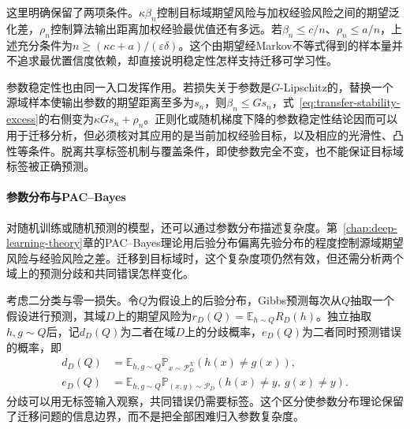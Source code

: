 这里明确保留了两项条件。$\kappa\beta_n$控制目标域期望风险与加权经验风险之间的期望泛化差，$\rho_n$控制算法输出距离加权经验最优值还有多远。若$\beta_n\leq c/n$、$\rho_n\leq a/n$，上述充分条件为$n\geq(\kappa c+a)/(\varepsilon\delta)$。这个由期望经Markov不等式得到的样本量并不追求最优置信度依赖，却直接说明稳定性怎样支持迁移可学习性。

参数稳定性也由同一入口发挥作用。若损失关于参数是$G$-Lipschitz的，替换一个源域样本使输出参数的期望距离至多为$s_n$，则$\beta_n\leq Gs_n$，式~\eqref{eq:transfer-stability-excess}的右侧变为$\kappa Gs_n+\rho_n$。正则化或随机梯度下降的参数稳定性结论因而可以用于迁移分析，但必须核对其应用的是当前加权经验目标，以及相应的光滑性、凸性等条件。脱离共享标签机制与覆盖条件，即使参数完全不变，也不能保证目标域标签被正确预测。

\paragraph{参数分布与PAC--Bayes}
\label{sec:transfer-pac-bayes}

对随机训练或随机预测的模型，还可以通过参数分布描述复杂度。第~\ref{chap:deep-learning-theory}章的PAC--Bayes理论用后验分布偏离先验分布的程度控制源域期望风险与经验风险之差。迁移到目标域时，这个复杂度项仍然有效，但还需分析两个域上的预测分歧和共同错误怎样变化。

考虑二分类与零一损失。令$Q$为假设上的后验分布，Gibbs预测每次从$Q$抽取一个假设进行预测，其域$D$上的期望风险为$r_D(Q)=\mathbb E_{h\sim Q}R_D(h)$。独立抽取$h,g\sim Q$后，记$d_D(Q)$为二者在域$D$上的分歧概率，$e_D(Q)$为二者同时预测错误的概率，即
\begin{align*}
 d_D(Q)&=\mathbb E_{h,g\sim Q}\mathbb P_{x\sim\mathcal P_D^X}(h(x)\neq g(x)),\\
 e_D(Q)&=\mathbb E_{h,g\sim Q}\mathbb P_{(x,y)\sim\mathcal P_D}
                       (h(x)\neq y,\ g(x)\neq y).
\end{align*}
分歧可以用无标签输入观察，共同错误仍需要标签。这个区分使参数分布理论保留了迁移问题的信息边界，而不是把全部困难归入参数复杂度。

